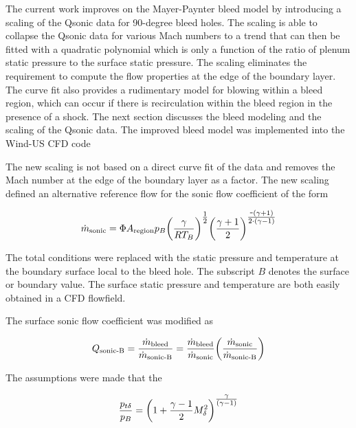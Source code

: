 The current work improves on the Mayer-Paynter bleed model by introducing a scaling of the Qsonic data for 90-degree bleed holes. The scaling is able to collapse the Qsonic data for various Mach numbers to a trend that can then be fitted with a quadratic polynomial which is only a function of the ratio of plenum static pressure to the surface static pressure. The scaling eliminates the requirement to compute the flow properties at the edge of the boundary layer. The curve fit also provides a rudimentary model for blowing within a bleed region, which can occur if there is recirculation within the bleed region in the presence of a shock. The next section discusses the bleed modeling and the scaling of the Qsonic data. The improved bleed model was implemented into the Wind-US CFD code








The new scaling is not based on a direct curve fit of the data and removes the Mach number at the edge of the boundary layer as a factor. The new scaling defined an alternative reference flow for the sonic flow coefficient of the form

$$ \dot{m}_{\textrm{sonic}} = \Phi A_{\textrm{region}} p_B \qty(\frac{\gamma}{RT_B})^{\textstyle\frac{1}{2}} \qty(\frac{\gamma+1}{2})^{\textstyle\frac{\texttt{-}\qty(\gamma+1)}{2\cdot\qty(\gamma-1)}}  $$

The total conditions were replaced with the static pressure and temperature at the boundary surface local to the bleed hole. The subscript $B$ denotes the surface or boundary value. The surface static pressure and temperature are both easily obtained in a CFD flowfield. 

The surface sonic flow coefficient was modified as

$$ Q_{\textrm{sonic-B}} = \frac{\dot{m}_{\textrm{bleed}}}{\dot{m}_{\textrm{sonic-B}}} = \frac{\dot{m}_{\textrm{bleed}}}{\dot{m}_{\textrm{sonic}}} \qty(\frac{\dot{m}_{\textrm{sonic}}}{\dot{m}_{\textrm{sonic-B}}}) $$

The assumptions were made that the 

$$ \frac{p_{t\delta}}{p_B} = \qty(1+\frac{\gamma-1}{2}M_\delta^2)^{\textstyle\frac{\gamma}{\qty(\gamma-1)}} $$

